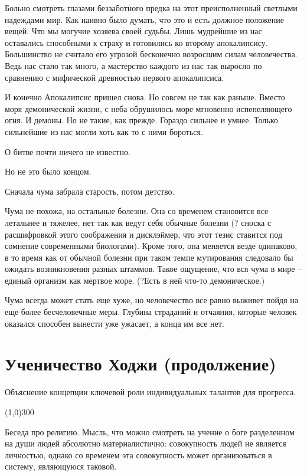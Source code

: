 \documentclass[12pt,a4paper]{article}
\newcommand{\sep}{
	\begin{center}
		\line(1,0){300}
	\end{center}
}
\begin{document}
Больно смотреть глазами беззаботного предка на этот преисполненный светлыми надеждами мир. Как наивно было думать, что это и есть должное положение вещей. Что мы могучие хозяева своей судьбы. Лишь мудрейшие из нас оставались способными к страху и готовились ко второму апокалипсису. Большинство не считало его угрозой бесконечно возросшим силам человечества. Ведь нас стало так много, а мастерство каждого из нас так выросло по сравнению с мифической древностью первого апокалипсиса.

И конечно Апокалипсис пришел снова. Но совсем не так как раньше. Вместо моря демонической жизни, с неба обрушилось море мгновенно испепеляющего огня. И демоны. Но не такие, как прежде. Гораздо сильнее и умнее. Только сильнейшие из нас могли хоть как то с ними бороться.


О битве почти ничего не известно. 

Но не это было концом.

Сначала чума забрала старость, потом детство.

Чума не похожа, на остальные болезни. Она со временем становится все летальнее и тяжелее, нет так как ведут себя обычные болезни (? сноска с расшифровкой этого соображения и дисклэймер, что этот тезис ставится под сомнение современными биологами). Кроме того, она меняется везде одинаково, в то время как от обычной болезни при таком темпе мутирования следовало бы ожидать возникновения разных штаммов. Такое ощущение, что вся чума в мире -- единый организм как мертвое море. (?Есть в ней что-то демоническое.)

Чума всегда может стать еще хуже, но человечество все равно выживет пойдя на еще более бесчеловечные меры. Глубина страданий и отчаяния, которые человек оказался способен вынести уже ужасает, а конца им все нет.

\section*{Ученичество Ходжи (продолжение)}

Объяснение концепции ключевой роли индивидуальных талантов для прогресса.

\sep

Беседа про религию. Мысль, что можно смотреть на учение о боге разделенном на души людей абсолютно материалистично: совокупность людей не является личностью, однако со временем эта совокупность может организоваться в систему, являющуюся таковой.
\end{document}
